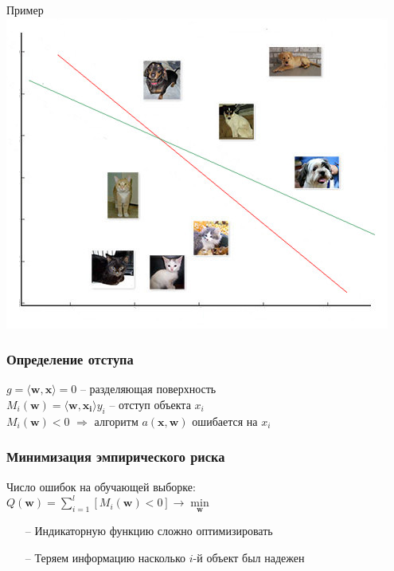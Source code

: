 \documentclass[10pt]{beamer}
\begin{document}
\begin{frame}{Пример}
  \centering
  \includegraphics[width=0.9 \textwidth, keepaspectratio]{images/catdog}
\end{frame}


\begin{frame}\frametitle{Определение отступа}
	${g = \langle \mathbf{w}, \mathbf{x}\rangle = 0}$ -- разделяющая поверхность\\
	$M_i(\mathbf{w}) = \langle \mathbf{w}, \mathbf{x_i}\rangle y_i$ -- отступ объекта $x_i$\\
	${M_i(\mathbf{w})<0}$ $\Rightarrow$ алгоритм $a(\mathbf{x},\mathbf{w})$ ошибается на $x_i$
\end{frame}

{
\begin{frame}\frametitle{Минимизация эмпирического риска}
	Число ошибок на обучающей выборке:\\
	\bigbreak
	${Q(\mathbf{w}) = \sum\limits_{i=1}^l \left[ M_i(\mathbf{w}) < 0 \right] \rightarrow \min\limits_{\mathbf{w}} }$\\
	\bigbreak
	\pause
  \begin{itemize}[<+->]
		\item[--] Индикаторную функцию сложно оптимизировать
		\item[--] Теряем информацию насколько ${i}$-й объект был надежен
	\end{itemize}
\end{frame}
}
\end{document}
